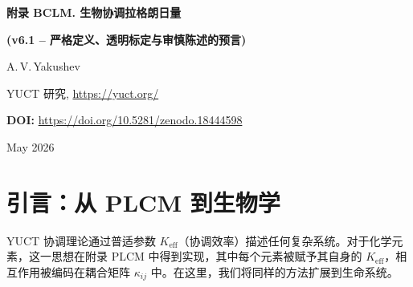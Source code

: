 \documentclass[12pt,a4paper]{article}
\newcommand{\REL}{\mathcal{K}}          %
\begin{document}
	
	\begin{titlepage}
		\centering
		\vspace*{2cm}
		{\Huge\bfseries 附录 BCLM. 生物协调拉格朗日量\par}
		\vspace{0.3cm}
		{\Large\bfseries (v6.1 – 严格定义、透明标定与审慎陈述的预言)\par}
		\vspace{1.5cm}
		{\large A.\,V.\,Yakushev\par}
		{\normalsize YUCT 研究, \url{https://yuct.org/}\par}
		\vspace{1.0cm}
		{\normalsize \textbf{DOI:} \url{https://doi.org/10.5281/zenodo.18444598}\par}
		\vspace{1.0cm}
		{\normalsize May 2026\par}
		\vfill
		\begin{abstract}
			\noindent
			本文档提出了生物协调拉格朗日量 (BCLM)，作为雅库舍夫统一协调理论 (YUCT) 的一个自洽、数据驱动的模块。
			每个生物对象都被赋予一个相对协调效率 \(\REL\)，通过 YPSDC 协议统一定义为压缩比 \(H(\mathcal{A})/H(\kappa)\) 除以理论最大值。
			提供了关于密码子、氨基酸、酶、突变相关修复效率、异速生长常数和神经元参数的完整表格。
			从 YUCT 常数推导出的一个普现代数兼容规则，基于蛋白质–蛋白质结合数据进行了标定，用于支配任意两个生物实体之间的相互作用。
			长寿协议被表述为一个可证伪的定量假设；其预言基于普适误差律和细胞层次结构的乘法误差结构推导得出。
			关键的高级模块（时间协调、免疫、毒物、多生物体、分子伴侣、翻译后修饰）被恢复并用统一的 \(\REL\) 框架表述。
			讨论了所有定义、标定和局限性，以确保科学严谨性。
		\end{abstract}
	\end{titlepage}
	
	\tableofcontents
	\newpage
	
	\section{引言：从 PLCM 到生物学}
	YUCT 协调理论通过普适参数 \(K_{\mathrm{eff}}\)（协调效率）描述任何复杂系统。对于化学元素，这一思想在附录 PLCM 中得到实现，其中每个元素被赋予其自身的 \(K_{\mathrm{eff}}\)，相互作用被编码在耦合矩阵 \(\kappa_{ij}\) 中。在这里，我们将同样的方法扩展到生命系统。
	
\end{document}

